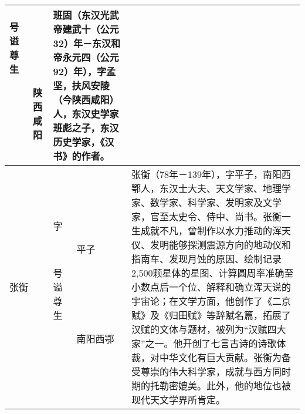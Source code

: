 \begin{longtable}{|>{\centering\namefont\heiti}m{2em}|>{\centering\tiny}m{3.0em}|>{\xzfont\kaiti}m{7.3em}|}
\begin{description}
    \item[号] 
    \item[谥] 
    \item[尊] 
    \item[生] 陕西咸阳
    \end{description} & 班固（东汉光武帝建武十（公元32）年－东汉和帝永元四（公元92）年），字孟坚，扶风安陵（今陕西咸阳）人，东汉史学家班彪之子，东汉历史学家，《汉书》的作者。 \tabularnewline\hline
    张衡 & \begin{description}
    \item[字] 平子
    \item[号] 
    \item[谥] 
    \item[尊] 
    \item[生] 南阳西鄂
    \end{description} &  张衡（78年－139年），字平子，南阳西鄂人，东汉士大夫、天文学家、地理学家、数学家、科学家、发明家及文学家，官至太史令、侍中、尚书。张衡一生成就不凡，曾制作以水力推动的浑天仪、发明能够探测震源方向的地动仪和指南车、发现月蚀的原因、绘制记录2,500颗星体的星图、计算圆周率准确至小数点后一个位、解释和确立浑天说的宇宙论；在文学方面，他创作了《二京赋》及《归田赋》等辞赋名篇，拓展了汉赋的文体与题材，被列为“汉赋四大家”之一。他开创了七言古诗的诗歌体裁，对中华文化有巨大贡献。张衡为备受尊崇的伟大科学家，成就与西方同时期的托勒密媲美。此外，他的地位也被现代天文学界所肯定。\tabularnewline\hline

    \bottomrule
\end{longtable}


